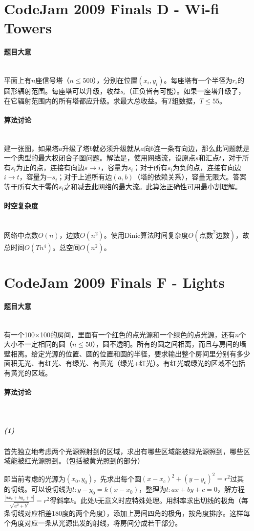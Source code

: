 \documentclass[UTF8]{ctexart}
\newcommand{\myparagraph}[1]{\paragraph{#1}\mbox{}\\}
\theoremstyle{nonumberplain}
\begin{document}
	\section{CodeJam 2009 Finals D - Wi-fi Towers}
	
		\myparagraph{题目大意}
		
			平面上有$n$座信号塔（$n \leq 500$），分别在位置$(x_i,y_i)$。每座塔有一个半径为$r_i$的圆形辐射范围。每座塔可以升级，收益$s_i$（正负皆有可能）。如果一座塔升级了，在它辐射范围内的所有塔都应升级。求最大总收益。有$T$组数据，$T \leq 55$。
		
		\myparagraph{算法讨论}
		
			建一张图，如果塔$a$升级了塔$b$就必须升级就从$a$向$b$连一条有向边，那么此问题就是一个典型的最大权闭合子图问题。解法是，使用网络流，设原点$s$和汇点$t$，对于所有$s_i$为正的点，连接有向边$s \to i$，容量为$s_i$；对于所有$s_i$为负的点，连接有向边$i \to t$，容量为$-s_i$；对于上述所有边$(a,b)$（塔的依赖关系），容量无限大。答案等于所有大于零的$s_i$之和减去此网络的最大流。此算法正确性可用最小割理解。
		
		\myparagraph{时空复杂度}
		
			网络中点数$O(n)$，边数$O(n^2)$。使用Dinic算法时间复杂度$O(\mbox{点数}^2\mbox{边数})$，故总时间$O(Tn^4)$。总空间$O(n^2)$。
	
	\section{CodeJam 2009 Finals F - Lights}
	
		\myparagraph{题目大意}
		
			有一个100×100的房间，里面有一个红色的点光源和一个绿色的点光源，还有$n$个大小不一定相同的圆（$n \leq 50$），圆不透明。所有的圆之间相离，而且与房间的墙壁相离。给定光源的位置、圆的位置和圆的半径，要求输出整个房间里分别有多少面积无光、有红光、有绿光、有黄光（绿光+红光）。有红光或绿光的区域不包括有黄光的区域。
		
		\myparagraph{算法讨论}
		
			\subparagraph{(1)}
			首先独立地考虑两个光源照射到的区域，求出有哪些区域能被绿光源照到，哪些区域能被红光源照到。（包括被黄光照到的部分）
			
			即当前考虑的光源为$(x_0,y_0)$，先求出每个圆$(x-x_c)^2+(y-y_c)^2=r^2$过其的切线。可以设切线为$l:y-y_0=k(x-x_0)$，整理为$l:ax+by+c=0$，解方程$\frac{|ax_c+by_c+c|}{\sqrt{a^2+b^2}}=r^2$得斜率$k$。此处$k$无意义时应特殊处理。用斜率求出切线的极角（每条切线对应相差180度的两个角度），添加上房间四角的极角，按角度排序。这样每个角度对应一条从光源出发的射线，将房间分成若干部分。
			
\end{document}

